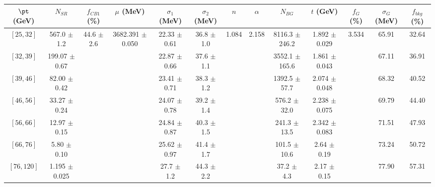 \begin{tabular}{c||c|c|c|c|c|c|c|c|c|c|c||c}
$\pt$ (GeV) & $N_{SR}$ & $f_{CB1}$ (\%) & $\mu$ (MeV) & $\sigma_1$ (MeV) & $\sigma_2$ (MeV) & $n$ & $\alpha$ & $N_{BG}$ & $t$ (GeV) & $f_G$ (\%) & $\sigma_G$ (MeV) & $f_{bkg}$ (\%) \\
\hline
$[25, 32]$ & 567.0 $\pm$ 1.2 & \multirow{7}{*}{44.6 $\pm$ 2.6} & \multirow{7}{*}{3682.391 $\pm$ 0.050} & 22.33 $\pm$ 0.61 & 36.8 $\pm$ 1.0 & \multirow{7}{*}{1.084} & \multirow{7}{*}{2.158} & 8116.3 $\pm$ 246.2 & 1.892 $\pm$ 0.029 & \multirow{7}{*}{3.534} & 65.91 & 32.64\\
$[32, 39]$ & 199.07 $\pm$ 0.67 &  &  & 22.87 $\pm$ 0.66 & 37.6 $\pm$ 1.1 &  &  & 3552.1 $\pm$ 165.6 & 1.861 $\pm$ 0.043 &  & 67.11 & 36.91\\
$[39, 46]$ & 82.00 $\pm$ 0.42 &  &  & 23.41 $\pm$ 0.71 & 38.3 $\pm$ 1.2 &  &  & 1392.5 $\pm$ 57.7 & 2.074 $\pm$ 0.048 &  & 68.32 & 40.52\\
$[46, 56]$ & 33.27 $\pm$ 0.24 &  &  & 24.07 $\pm$ 0.78 & 39.2 $\pm$ 1.4 &  &  & 576.2 $\pm$ 32.0 & 2.238 $\pm$ 0.075 &  & 69.79 & 44.40\\
$[56, 66]$ & 12.97 $\pm$ 0.15 &  &  & 24.84 $\pm$ 0.87 & 40.3 $\pm$ 1.5 &  &  & 241.3 $\pm$ 13.5 & 2.342 $\pm$ 0.083 &  & 71.51 & 47.93\\
$[66, 76]$ & 5.80 $\pm$ 0.10 &  &  & 25.62 $\pm$ 0.97 & 41.4 $\pm$ 1.7 &  &  & 101.5 $\pm$ 10.6 & 2.64 $\pm$ 0.19 &  & 73.24 & 50.72\\
$[76, 120]$ & 1.195 $\pm$ 0.025 &  &  & 27.7 $\pm$ 1.2 & 44.3 $\pm$ 2.2 &  &  & 37.2 $\pm$ 4.3 & 2.17 $\pm$ 0.15 &  & 77.90 & 57.31\\
\end{tabular}
